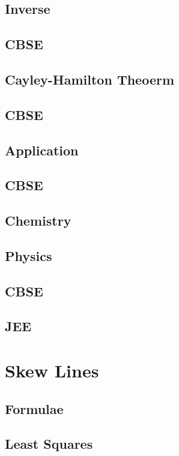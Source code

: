 \documentclass[journal]{IEEEtran}
\begin{document}
\subsection{Inverse}

\subsection{CBSE}

\subsection{Cayley-Hamilton Theoerm}

\subsection{CBSE}

\subsection{Application}

\subsection{CBSE}

\subsection{Chemistry}

\subsection{Physics}

\subsection{CBSE}

\subsection{JEE}

\newpage
\section{Skew Lines}
\subsection{Formulae}

\subsection{Least Squares}

\end{document}
